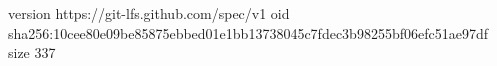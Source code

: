 version https://git-lfs.github.com/spec/v1
oid sha256:10cee80e09be85875ebbed01e1bb13738045c7fdec3b98255bf06efc51ae97df
size 337
